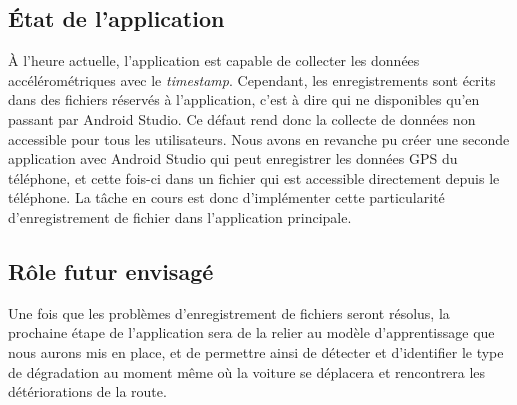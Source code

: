 \subsection{État de l'application}
À l'heure actuelle, l'application est capable de collecter les données accélérométriques avec le \textit{timestamp}. Cependant, les enregistrements sont écrits dans des fichiers réservés à l'application, c'est à dire qui ne disponibles qu'en passant par Android Studio. Ce défaut rend donc la collecte de données non accessible pour tous les utilisateurs. Nous avons en revanche pu créer une seconde application avec Android Studio qui peut enregistrer les données GPS du téléphone, et cette fois-ci dans un fichier qui est accessible directement depuis le téléphone. La tâche en cours est donc d'implémenter cette particularité d'enregistrement de fichier dans l'application principale.

\subsection{Rôle futur envisagé}
Une fois que les problèmes d'enregistrement de fichiers seront résolus, la prochaine étape de l'application sera de la relier au modèle d'apprentissage que nous aurons mis en place, et de permettre ainsi de détecter et d'identifier le type de dégradation au moment même où la voiture se déplacera et rencontrera les détériorations de la route.